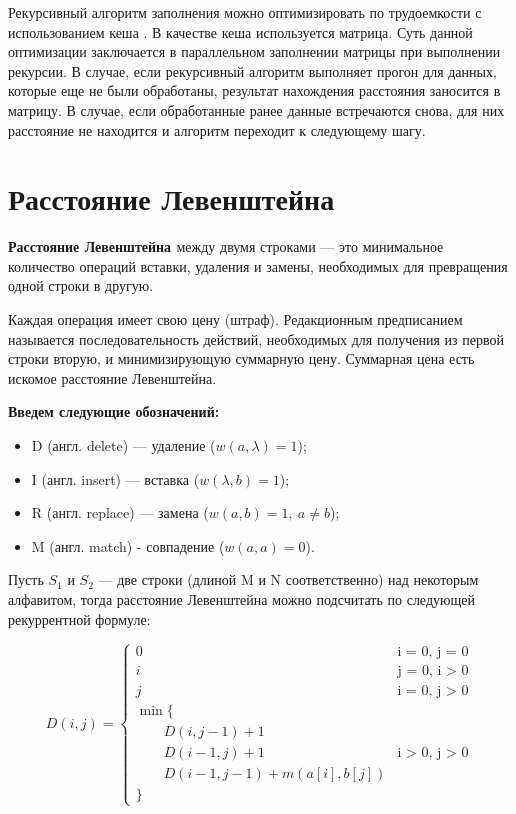 Рекурсивный алгоритм заполнения можно оптимизировать по трудоемкости с использованием кеша \cite{cache}. В качестве кеша используется матрица. Суть данной оптимизации заключается в параллельном заполнении матрицы при выполнении рекурсии. 
В случае, если рекурсивный алгоритм выполняет прогон для данных, которые еще не были обработаны, результат нахождения расстояния заносится в матрицу. В случае, если обработанные ранее данные встречаются снова, для них расстояние не находится и алгоритм переходит к следующему шагу.

\section{Расстояние Левенштейна}

\textbf{Расстояние Левенштейна \cite{Levenshtein}} между двумя строками — это минимальное количество операций вставки, удаления и замены, необходимых для превращения одной строки в другую.

Каждая операция имеет свою цену (штраф). Редакционным предписанием называется последовательность действий, необходимых для получения из первой строки вторую, и минимизирующую суммарную цену. Суммарная цена есть искомое расстояние Левенштейна.

\textbf{Введем следующие обозначений:} 
\begin{itemize}
	\item D (англ. delete) — удаление ($w(a,\lambda)=1$);
	\item I (англ. insert) — вставка ($w(\lambda,b)=1$);
	\item R (англ. replace) — замена  ($w(a,b)=1, \medspace a \neq b$);
	\item M (англ. match) - совпадение ($w(a,a)=0$).
\end{itemize}

Пусть $S_{1}$ и $S_{2}$ — две строки (длиной M и N соответственно) над некоторым алфавитом, тогда расстояние Левенштейна можно подсчитать по следующей рекуррентной формуле:

\begin{equation}
	\label{eq:D}
	D(i, j) = \begin{cases}
		
		0 &\text{i = 0, j = 0}\\
		i &\text{j = 0, i > 0}\\
		j &\text{i = 0, j > 0}\\
		\min \lbrace \\
		\qquad D(i, j-1) + 1\\
		\qquad D(i-1, j) + 1 &\text{i > 0, j > 0}\\
		\qquad D(i-1, j-1) + m(a[i], b[j])\\
		\rbrace
	\end{cases}
\end{equation}


